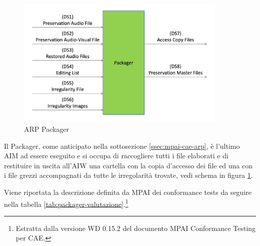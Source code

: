 \begin{figure}[H]
    \centering
    \includegraphics[width=0.9\textwidth]{img/packager.png}
    \caption{\ac{ARP} Packager}
    \label{fig:packager}
\end{figure}

Il Packager, come anticipato nella sottosezione \ref{ssec:mpai-cae-arp}, è l'ultimo \ac{AIM} ad essere eseguito e si occupa di raccogliere tutti i file elaborati e di restituire in uscita all'\ac{AIW} una cartella con la copia d'accesso dei file ed una con i file grezzi accompagnati da tutte le irregolarità trovate, vedi schema in figura \ref{fig:packager}.

Viene riportata la descrizione definita da \ac{MPAI} dei conformance tests da seguire nella tabella \ref{tab:packager-valutazione}.\footnote{Estratta dalla versione WD 0.15.2 del documento MPAI Conformance Testing per \ac{CAE}.} 

